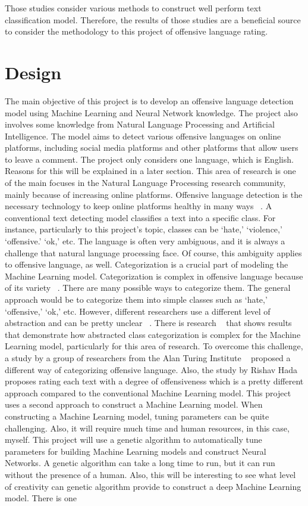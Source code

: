 \documentclass[12pt, natbib=false]{article}
\begin{document}
Those studies consider various methods to construct well perform text classification model. Therefore, the results of those studies are a beneficial source to consider the methodology to this project of offensive language rating. 


\section{Design}

The main objective of this project is to develop an offensive language detection model using Machine Learning and Neural Network knowledge. The project also involves some knowledge from Natural Language Processing and Artificial Intelligence. The model aims to detect various offensive languages on online platforms, including social media platforms and other platforms that allow users to leave a comment. The project only considers one language, which is English. Reasons for this will be explained in a later section. This area of research is one of the main focuses in the Natural Language Processing research community, mainly because of increasing online platforms. Offensive language detection is the necessary technology to keep online platforms healthy in many ways ~\cite{vidgen2019challenges}. A conventional text detecting model classifies a text into a specific class. For instance, particularly to this project’s topic, classes can be ‘hate,’ ‘violence,’ ‘offensive.’ ‘ok,’ etc. The language is often very ambiguous, and it is always a challenge that natural language processing face. Of course, this ambiguity applies to offensive language, as well. Categorization is a crucial part of modeling the Machine Learning model. Categorization is complex in offensive language because of its variety ~\cite{vidgen2019challenges}. There are many possible ways to categorize them. The general approach would be to categorize them into simple classes such as ‘hate,’ ‘offensive,’ ‘ok,’ etc. However, different researchers use a different level of abstraction and can be pretty unclear ~\cite{vidgen2019challenges}. There is research ~\cite{malmasi2017detecting} that shows results that demonstrate how abstracted class categorization is complex for the Machine Learning model, particularly for this area of research. To overcome this challenge, a study by a group of researchers from the Alan Turing Institute ~\cite{vidgen2019challenges} proposed a different way of categorizing offensive language. Also, the study by Rishav Hada ~\cite{hada2021ruddit} proposes rating each text with a degree of offensiveness which is a pretty different approach compared to the conventional Machine Learning model. This project uses a second approach to construct a Machine Learning model. When constructing a Machine Learning model, tuning parameters can be quite challenging. Also, it will require much time and human resources, in this case, myself. This project will use a genetic algorithm to automatically tune parameters for building Machine Learning models and construct Neural Networks. A genetic algorithm can take a long time to run, but it can run without the presence of a human. Also, this will be interesting to see what level of creativity can genetic algorithm provide to construct a deep Machine Learning model. There is one 
\end{document}
